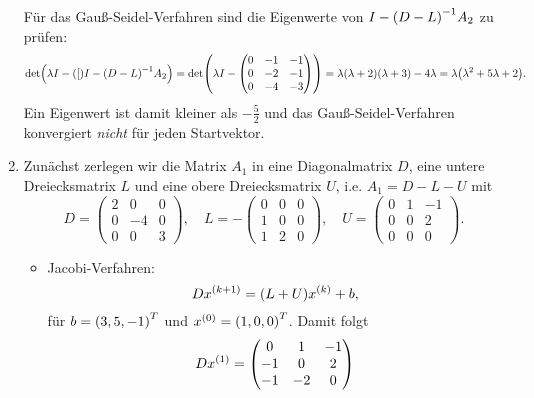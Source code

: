 \documentclass{exercise}
\begin{document}
\begin{enumerate}
        Für das Gauß-Seidel-Verfahren sind die Eigenwerte von \(I - \parentheses*{D - L}^{-1}A_2\) zu prüfen:
        \[
            \det\parentheses*{\lambda I - \parentheses*[I - \parentheses*{D - L}^{-1}A_2} = \det\parentheses*{\lambda I - \begin{pmatrix}
                0 & -1 & -1\\
                0 & -2 & -1\\
                0 & -4 & -3
            \end{pmatrix}} = \lambda\parentheses*{\lambda + 2}\parentheses*{\lambda + 3} - 4\lambda = \lambda\parentheses*{\lambda^2 + 5\lambda + 2}.
        \]
        Ein Eigenwert ist damit kleiner als \(-\frac{5}{2}\) und das Gauß-Seidel-Verfahren konvergiert \emph{nicht} für jeden Startvektor.
        \item Zunächst zerlegen wir die Matrix \(A_1\) in eine Diagonalmatrix \(D\), eine untere Dreiecksmatrix \(L\) und eine obere Dreiecksmatrix \(U\), i.e. \(A_1 = D - L - U\) mit
        \[
            D = \begin{pmatrix}
                2 & 0 & 0\\
                0 & -4 & 0\\
                0 & 0 & 3
            \end{pmatrix}, \quad L = -\begin{pmatrix}
                0 & 0 & 0\\
                1 & 0 & 0\\
                1 & 2 & 0
            \end{pmatrix}, \quad U = \begin{pmatrix}
                0 & 1 & -1\\
                0 & 0 & 2\\
                0 & 0 & 0
            \end{pmatrix}.
        \]
        \begin{itemize}
            \item Jacobi-Verfahren:
            \[
                Dx^{\parentheses*{k + 1}} = \parentheses*{L + U}x^{\parentheses*{k}} + b,
            \]
            für \(b = \parentheses*{3, 5, -1}^T\) und \(x^{\parentheses*{0}} = \parentheses*{1, 0, 0}^T\).
            Damit folgt
            \[
                Dx^{\parentheses*{1}} = \begin{pmatrix}
                    0 & 1 & -1\\
                    -1 & 0 & 2\\
                    -1 & -2 & 0

\end{pmatrix}\]
\end{itemize}
\end{enumerate}
\end{document}
